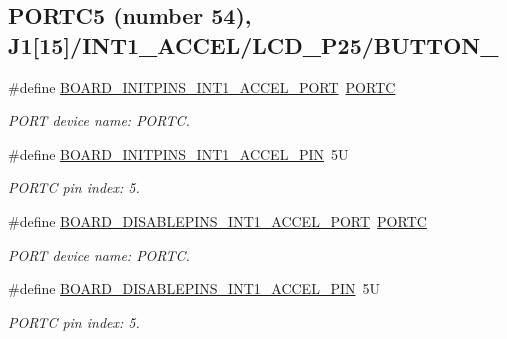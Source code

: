 \subsection*{P\+O\+R\+T\+C5 (number 54), J1\mbox{[}15\mbox{]}/\+I\+N\+T1\+\_\+\+A\+C\+C\+E\+L/\+L\+C\+D\+\_\+\+P25/\+B\+U\+T\+T\+O\+N\+\_}
\begin{DoxyCompactItemize}
\item 
\mbox{\label{group__pin__mux_ga9f2aacb639ae40202cff5e33e245ae27}} 
\#define \mbox{\hyperlink{group__pin__mux_ga9f2aacb639ae40202cff5e33e245ae27}{B\+O\+A\+R\+D\+\_\+\+I\+N\+I\+T\+P\+I\+N\+S\+\_\+\+I\+N\+T1\+\_\+\+A\+C\+C\+E\+L\+\_\+\+P\+O\+RT}}~\mbox{\hyperlink{group___p_o_r_t___peripheral___access___layer_ga68fea88642279a70246e026e7221b0a5}{P\+O\+R\+TC}}
\begin{DoxyCompactList}\small\item\em P\+O\+RT device name\+: P\+O\+R\+TC. \end{DoxyCompactList}\item 
\mbox{\label{group__pin__mux_gaa91049c15be436a543548ccc863f45db}} 
\#define \mbox{\hyperlink{group__pin__mux_gaa91049c15be436a543548ccc863f45db}{B\+O\+A\+R\+D\+\_\+\+I\+N\+I\+T\+P\+I\+N\+S\+\_\+\+I\+N\+T1\+\_\+\+A\+C\+C\+E\+L\+\_\+\+P\+IN}}~5U
\begin{DoxyCompactList}\small\item\em P\+O\+R\+TC pin index\+: 5. \end{DoxyCompactList}\item 
\mbox{\label{group__pin__mux_ga6d1d8bcc5c53670633156f789dc53d52}} 
\#define \mbox{\hyperlink{group__pin__mux_ga6d1d8bcc5c53670633156f789dc53d52}{B\+O\+A\+R\+D\+\_\+\+D\+I\+S\+A\+B\+L\+E\+P\+I\+N\+S\+\_\+\+I\+N\+T1\+\_\+\+A\+C\+C\+E\+L\+\_\+\+P\+O\+RT}}~\mbox{\hyperlink{group___p_o_r_t___peripheral___access___layer_ga68fea88642279a70246e026e7221b0a5}{P\+O\+R\+TC}}
\begin{DoxyCompactList}\small\item\em P\+O\+RT device name\+: P\+O\+R\+TC. \end{DoxyCompactList}\item 
\mbox{\label{group__pin__mux_ga1c92d20f1a346299de88b225625abee6}} 
\#define \mbox{\hyperlink{group__pin__mux_ga1c92d20f1a346299de88b225625abee6}{B\+O\+A\+R\+D\+\_\+\+D\+I\+S\+A\+B\+L\+E\+P\+I\+N\+S\+\_\+\+I\+N\+T1\+\_\+\+A\+C\+C\+E\+L\+\_\+\+P\+IN}}~5U
\begin{DoxyCompactList}\small\item\em P\+O\+R\+TC pin index\+: 5. \end{DoxyCompactList}\end{DoxyCompactItemize}
